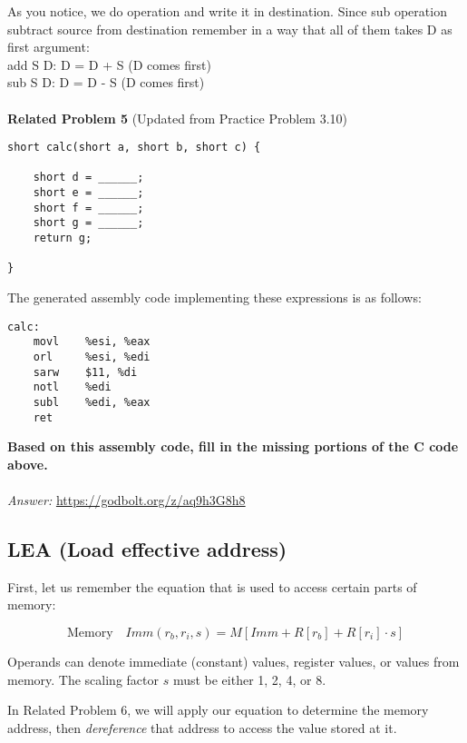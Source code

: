 \documentclass{article}
\begin{document}
As you notice, we do operation and write it in destination. Since sub operation subtract source from destination remember in a way that all of them takes D as first argument: \\
add S D:  D = D + S (D comes first) \\
sub S D:  D = D - S (D comes first) \\ 
\\
\noindent
\textbf{Related Problem 5} (Updated from Practice Problem 3.10)

\begin{lstlisting}
short calc(short a, short b, short c) {

    short d = ______;
    short e = ______;
    short f = ______;
    short g = ______;
    return g;
    
}
\end{lstlisting}

The generated assembly code implementing these expressions is as follows:

\begin{lstlisting}
calc:
    movl    %esi, %eax
    orl     %esi, %edi
    sarw    $11, %di
    notl    %edi
    subl    %edi, %eax
    ret
\end{lstlisting}

\noindent
\textbf{Based on this assembly code, fill in the missing portions of the C code above.} \\
\\
\textit{Answer: }\url{https://godbolt.org/z/aq9h3G8h8}
\subsection{LEA (Load effective address)}
First, let us remember the equation that is used to access certain parts of memory:
\noindent 
\\
\begin{tcolorbox}[colframe=black, colback=white, boxrule=1pt]
    \begin{equation*}
        \text{Memory} \quad \textit{Imm}(r_b, r_i, s) = M[\textit{Imm} + R[r_b] + R[r_i] \cdot s]
    \end{equation*}
    \caption{Operands can denote immediate (constant) values, register values, or values from memory. The scaling factor \( s \) must be either 1, 2, 4, or 8.}
    \label{equation_mem}
\end{tcolorbox}

\noindent

In Related Problem 6, we will apply our equation to determine the memory address, then \textit{dereference} that address to access the value stored at it.
\end{document}
